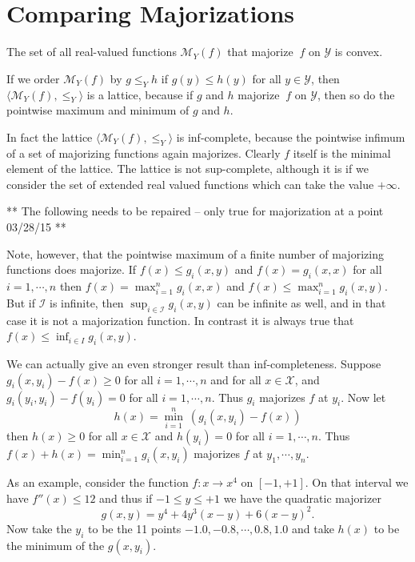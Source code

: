 \documentclass[
  12pt,
]{book}
\begin{document}
\hypertarget{comparing-majorizations}{%
\section{Comparing Majorizations}\label{comparing-majorizations}}

The set of all real-valued functions \(\mathcal{M}_Y(f)\) that majorize \(\ f\) on \(\mathcal{Y}\) is convex.

If we order \(\mathcal{M}_Y(f)\) by \(g\leq_Y h\) if \(g(y)\leq h(y)\) for all \(y\in\mathcal{Y}\), then \(\langle\mathcal{M}_Y(f),\leq_Y\rangle\) is a lattice, because if \(g\) and \(h\) majorize \(\ f\) on \(\mathcal{Y}\), then so do the pointwise maximum and minimum of \(g\) and \(h.\)

In fact the lattice \(\langle\mathcal{M}_Y(f),\leq_Y\rangle\) is inf-complete, because the pointwise infimum of a set of majorizing functions again majorizes. Clearly \(f\) itself is the minimal element of the lattice. The lattice is not sup-complete, although it is if we consider the set of extended real valued functions which can take the value \(+\infty\).

** The following needs to be repaired -- only true for majorization at a point 03/28/15 **

Note, however, that
the pointwise maximum of a finite number of majorizing functions does majorize.
If \(f(x)\leq g_i(x,y)\) and \(f(x)=g_i(x,x)\) for all \(i=1,\cdots,n\)
then \(f(x)=\max_{i=1}^n g_i(x,x)\) and \(f(x)\leq\max_{i=1}^n g_i(x,y)\).
But if \(\mathcal{I}\) is infinite, then \(\sup_{i\in\mathcal{I}}g_i(x,y)\) can be infinite as well, and in that case it is not a majorization function.
In contrast it is always true that \(f(x)\leq\inf_{i\in I}g_i(x,y)\).

We can actually give an even stronger result than inf-completeness.
Suppose \(g_i(x,y_i)-f(x)\geq 0\) for all \(i=1,\cdots,n\) and for all \(x\in\mathcal{X}\),
and \(g_i(y_i,y_i)-f(y_i)=0\) for all \(i=1,\cdots,n\). Thus \(g_i\)
majorizes \(f\) at \(y_i\). Now let
\[
h(x)=\min_{i=1}^n\ (g_i(x,y_i)-f(x))
\]
then \(h(x)\geq 0\) for all \(x\in\mathcal{X}\) and \(h(y_i)=0\) for
all \(i=1,\cdots,n\). Thus \(f(x)+h(x)=\min_{i=1}^n g_i(x,y_i)\)
majorizes \(f\) at \(y_1,\cdots,y_n\).

As an example, consider the function \(f:x\rightarrow x^4\) on \([-1,+1]\). On that interval we have \(f''(x)\leq 12\) and thus if \(-1\leq y\leq +1\) we have
the quadratic majorizer
\[
g(x,y)=y^4+4y^3(x-y)+6(x-y)^2.
\]
Now take the \(y_i\) to be the 11 points \(-1.0,-0.8,\cdots,0.8,1.0\) and
take \(h(x)\) to be the minimum of the \(g(x,y_i)\).
\end{document}

